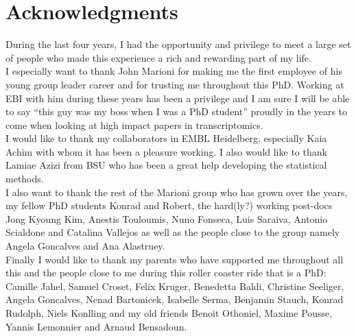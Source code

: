 
\bigskip

\begingroup
\let\clearpage\relax
\let\cleardoublepage\relax
\let\cleardoublepage\relax
\chapter*{Acknowledgments}
During the last four years, I had the opportunity and privilege to meet a large set of people who made this experience a rich and rewarding part of my life.\\

I especially want to thank John Marioni for making me the first employee of his young group leader career and for trusting me throughout this PhD. Working at EBI with him during these years has been a privilege and I am sure I will be able to say ``this guy was my boss when I was a PhD student'' proudly in the years to come when looking at high impact papers in transcriptomics.\\

I would like to thank my collaborators in EMBL Heidelberg, especially Kaia Achim with whom it has been a pleasure working. I also would like to thank Lamiae Azizi from BSU who has been a great help developing the statistical methods.\\

I also want to thank the rest of the Marioni group who has grown over the years, my fellow PhD students Konrad and Robert, the hard(ly?) working post-docs Jong Kyoung Kim, Anestis Touloumis, Nuno Fonseca, Luis Saraiva, Antonio Scialdone and Catalina Vallejos as well as the people close to the group namely Angela Goncalves and Ana Alastruey.\\

Finally I would like to thank my parents who have supported me throughout all this and the people close to me during this roller coaster ride that is a PhD: Camille Jahel, Samuel Croset, Felix Kruger, Benedetta Baldi, Christine Seeliger, Angela Goncalves, Nenad Bartonicek, Isabelle Serma, Benjamin Stauch, Konrad Rudolph, Niels Konlling and my old friends Benoit Othoniel, Maxime Pousse, Yannis Lemonnier and Arnaud Bensadoun.



\bigskip



\endgroup



